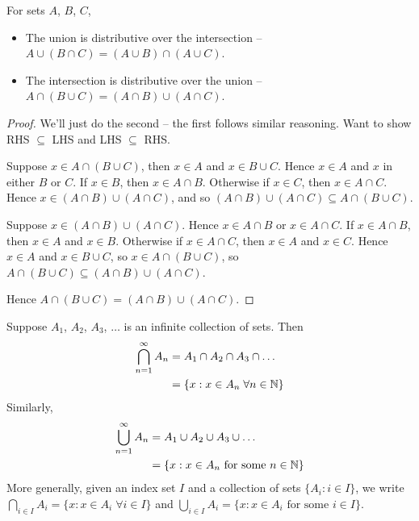 \documentclass{../template/note}
\begin{document}
    \begin{proposition}
        For sets \(A\), \(B\), \(C\),
        \begin{itemize}
            \item The union is distributive over the intersection -- \(A \cup (B \cap C) = (A \cup B) \cap (A \cup C)\).
            \item The intersection is distributive over the union -- \(A \cap (B \cup C) = (A \cap B) \cup (A \cap C)\).
        \end{itemize}        
    \end{proposition}
    
    

    \begin{proof}
        We'll just do the second -- the first follows similar reasoning. Want to show RHS \(\subseteq\) LHS and LHS \(\subseteq\) RHS.

        Suppose \(x \in A \cap (B \cup C)\), then \(x \in A\) and \(x \in B \cup C\). Hence \(x \in A\) and \(x\) in either \(B\) or \(C\). If \(x \in B\), then \(x \in A \cap B\). Otherwise if \(x \in C\), then \(x \in A \cap C\). Hence \(x \in (A \cap B) \cup (A \cap C)\), and so \((A \cap B) \cup (A \cap C) \subseteq A \cap (B \cup C)\).

        Suppose \(x \in (A \cap B) \cup (A \cap C)\). Hence \(x \in A \cap B\) or \(x \in A \cap C\). If \(x \in A \cap B\), then \(x \in A\) and \(x \in B\). Otherwise if \(x \in A \cap C\), then \(x \in A\) and \(x \in C\). Hence \(x \in A\) and \(x \in B \cup C\), so \(x \in A \cap (B \cup C)\), so \(A \cap (B \cup C) \subseteq (A \cap B) \cup (A \cap C)\).

        Hence \(A \cap (B \cup C) = (A \cap B) \cup (A \cap C)\).
    \end{proof}
    
    \begin{definition}
        Suppose \(A_1\), \(A_2\), \(A_3\), \(\dots\) is an infinite collection of sets. Then
        \begin{align*}
            \bigcap_{n=1}^\infty A_n &= A_1 \cap A_2 \cap A_3 \cap \dots \\
            &= \{x: x \in A_n \; \forall n \in \mathbb N\}
        \end{align*}
        Similarly,
        \begin{align*}
            \bigcup_{n=1}^\infty A_n &= A_1 \cup A_2 \cup A_3 \cup \dots \\
            &= \{x: x \in A_n \text{ for some } n \in \mathbb N\}
        \end{align*}
        More generally, given an index set \(I\) and a collection of sets \(\{A_i: i \in I\}\), we write \(\bigcap_{i \in I}A_i = \{x:x \in A_i \; \forall i \in I\}\) and \(\bigcup_{i \in I}A_i = \{x: x \in A_i \text{ for some } i \in I\}\).
    \end{definition}
    
\end{document}
